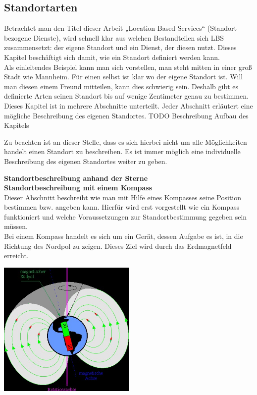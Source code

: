 \subsection{Standortarten}
Betrachtet man den Titel dieser Arbeit „Location Based Services“ (Standort bezogene Dienste), wird schnell klar aus welchen Bestandteilen sich LBS zusammensetzt: der eigene Standort und ein Dienst, der diesen nutzt. Dieses Kapitel beschäftigt sich damit, wie ein Standort definiert werden kann.
\\Als einleitendes Beispiel kann man sich vorstellen, man steht mitten in einer groß Stadt wie Mannheim. Für einen selbst ist klar wo der eigene Standort ist. Will man diesen einem Freund mitteilen, kann dies schwierig sein. Deshalb gibt es definierte Arten seinen Standort bis auf wenige Zentimeter genau zu bestimmen. Dieses Kapitel ist in mehrere Abschnitte unterteilt. Jeder Abschnitt erläutert eine mögliche Beschreibung des eigenen Standortes.
TODO Beschreibung Aufbau des Kapitels

Zu beachten ist an dieser Stelle, dass es sich hierbei nicht um alle Möglichkeiten handelt einen Standort zu beschreiben. Es ist immer möglich eine individuelle Beschreibung des eigenen Standortes weiter zu geben. 

\textbf{Standortbeschreibung anhand der Sterne}\\
\textbf{Standortbeschreibung mit einem Kompass}
\\Dieser Abschnitt beschreibt wie man mit Hilfe eines Kompasses seine Position bestimmen bzw. angeben kann. Hierfür wird erst vorgestellt wie ein Kompass funktioniert und welche Voraussetzungen zur Standortbestimmung gegeben sein müssen.
\\Bei einem Kompass handelt es sich um ein Gerät, dessen Aufgabe es ist, in die Richtung des Nordpol zu zeigen. Dieses Ziel wird durch das Erdmagnetfeld erreicht.

\includegraphics[width=0.50\textwidth]{ref/images/magnetfeld.jpg}
 

